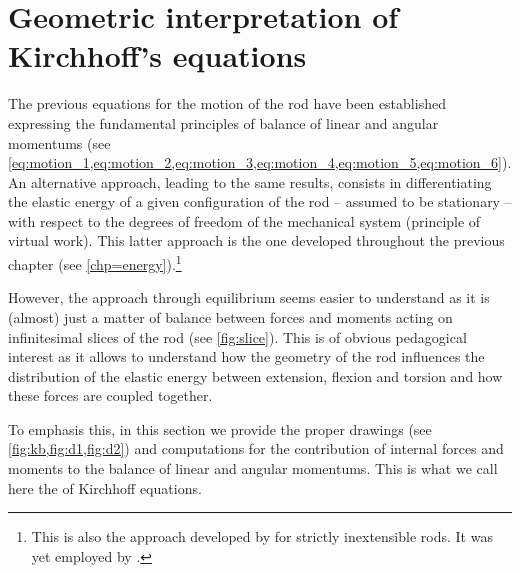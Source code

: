 \pagebreak
\section{Geometric interpretation of Kirchhoff's equations}\label{sec=geointerp}


The previous equations for the motion of the rod have been established expressing the fundamental principles of balance of linear and angular momentums (see \cref{eq:motion_1,eq:motion_2,eq:motion_3,eq:motion_4,eq:motion_5,eq:motion_6}). An alternative approach, leading to the same results, consists in differentiating the elastic energy of a given configuration of the rod -- assumed to be stationary -- with respect to the degrees of freedom of the mechanical system (principle of virtual work). This latter approach is the one developed throughout the previous chapter (see \cref{chp=energy}).\footnote{This is also the approach developed by  for strictly inextensible rods. It was yet employed by .}

However, the approach through equilibrium seems easier to understand as it is (almost) just a matter of balance between forces and moments acting on infinitesimal slices of the rod (see \cref{fig:slice}). This is of obvious pedagogical interest as it allows to understand how the geometry of the rod influences the distribution of the elastic energy between extension, flexion and torsion and how these forces are coupled together.

To emphasis this, in this section we provide the proper drawings (see \cref{fig:kb,fig:d1,fig:d2}) and computations for the contribution of internal forces and moments to the balance of linear and angular momentums. This is what we call here the  of Kirchhoff equations.


